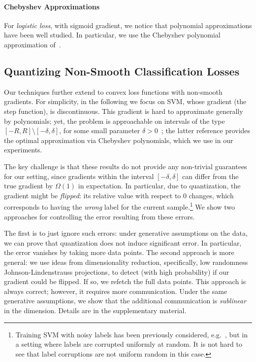 \documentclass{article}
\begin{document}
\paragraph{Chebyshev Approximations} 
For \emph{logistic loss}, with sigmoid gradient, we notice that polynomial approximations have been well studied. In particular, we use the Chebyshev polynomial approximation of~\cite{vlcek2012chebyshev}. 

\subsection{Quantizing Non-Smooth Classification Losses}

Our techniques further extend to convex loss functions with non-smooth gradients.  
For simplicity, in the following we focus on SVM, whose gradient (the step function), is discontinuous. 
This gradient is hard to approximate generally by polynomials; yet, the problem is approachable on intervals of the type $[-R, R] \setminus [-\delta, \delta]$, for some small parameter $\delta > 0$~\cite{frostig2016principal, allen2016faster}; the latter reference provides the optimal approximation via Chebyshev polynomials, which we use in our experiments. 

The key challenge is that these results do not provide any non-trivial guarantees for our setting, since gradients within the interval $[-\delta, \delta]$ can differ from the true gradient by $\Omega (1)$ in expectation. In particular, due to quantization, the gradient might be \emph{flipped}: 
its relative value with respect to $0$ changes, which corresponds to having the \emph{wrong} label for the current sample.\footnote{Training SVM with noisy labels has been previously considered, e.g.~\cite{Natarajan:2013:NIPS}, but in a setting where labels are corrupted uniformly at random. It is not hard to see that label corruptions are not uniform random in this case.}
We show two approaches for controlling the error resulting from these errors. 


The first is to just ignore such errors: under generative assumptions on the data, we can prove that quantization does not induce significant error. 
In particular, the error vanishes by taking more data points.
The second approach is more general: we use ideas from dimensionality reduction, specifically, low randomness Johnson-Lindenstrauss projections, to detect (with high probability) if our gradient could be flipped. If so, we refetch the full data points. 
This approach is always correct; however, it requires more communication.
Under the same generative assumptions, we show that the additional communication is \emph{sublinear} in the dimension.
Details are in the supplementary material.
\end{document}

